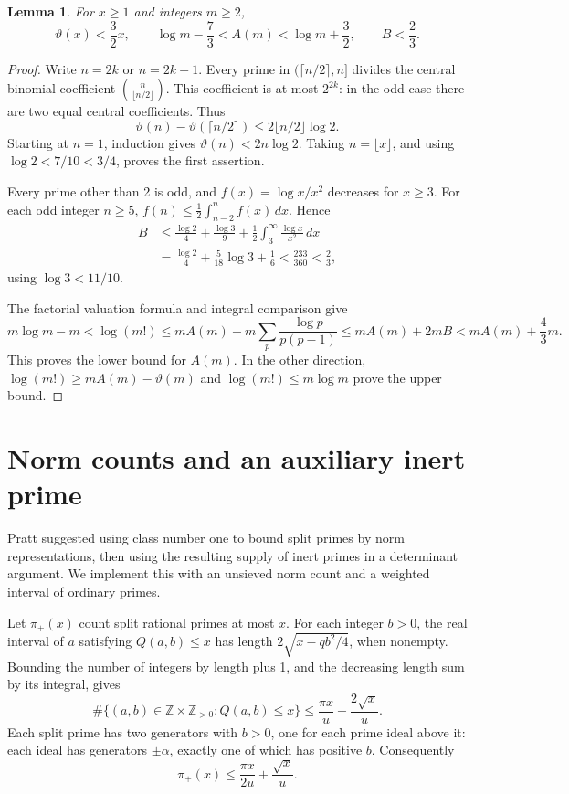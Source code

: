 \documentclass[11pt]{article}
\newtheorem{lemma}[theorem]{Lemma}
\newcommand{\Z}{\mathbb Z}
\begin{document}
\begin{lemma}\label{primelemma}
For \(x\ge1\) and integers \(m\ge2\),
\begin{equation}\label{prime-estimates}
 \vartheta(x)<\frac32x,\qquad
 \log m-\frac73<A(m)<\log m+\frac32,\qquad B<\frac23.
\end{equation}
\end{lemma}
\begin{proof}
Write \(n=2k\) or \(n=2k+1\). Every prime in
\((\lceil n/2\rceil,n]\) divides the central binomial coefficient
\(\binom n{\lfloor n/2\rfloor}\). This coefficient is at most
\(2^{2k}\): in the odd case there are two equal central coefficients.
Thus
\[
 \vartheta(n)-\vartheta(\lceil n/2\rceil)
 \le 2\lfloor n/2\rfloor\log2.
\]
Starting at \(n=1\), induction gives \(\vartheta(n)<2n\log2\).
Taking \(n=\lfloor x\rfloor\), and using \(\log2<7/10<3/4\),
proves the first assertion.

Every prime other than 2 is odd, and \(f(x)=\log x/x^2\) decreases
for \(x\ge3\). For each odd integer \(n\ge5\),
\(f(n)\le\tfrac12\int_{n-2}^n f(x)\,dx\). Hence
\begin{align*}
 B&\le\frac{\log2}{4}+\frac{\log3}{9}
                  +\frac12\int_3^\infty\frac{\log x}{x^2}\,dx\\
  &=\frac{\log2}{4}+\frac5{18}\log3+\frac16
    <\frac{233}{360}<\frac23,
\end{align*}
using \(\log3<11/10\).

The factorial valuation formula and integral comparison give
\[
 m\log m-m<\log(m!)
 \le mA(m)+m\sum_p\frac{\log p}{p(p-1)}
 \le mA(m)+2mB<mA(m)+\frac43m.
\]
This proves the lower bound for \(A(m)\). In the other direction,
\(\log(m!)\ge mA(m)-\vartheta(m)\) and
\(\log(m!)\le m\log m\) prove the upper bound.
\end{proof}

\section{Norm counts and an auxiliary inert prime}\label{norms}

Pratt \cite{pratt} suggested using class number one to bound split
primes by norm representations, then using the resulting supply of
inert primes in a determinant argument. We implement this with an
unsieved norm count and a weighted interval of ordinary primes.

Let \(\pi_+(x)\) count split rational primes at most \(x\). For each
integer \(b>0\), the real interval of \(a\) satisfying
\(Q(a,b)\le x\) has length \(2\sqrt{x-qb^2/4}\), when nonempty.
Bounding the number of integers by length plus 1, and the decreasing
length sum by its integral, gives
\[
 \#\{(a,b)\in\Z\times\Z_{>0}:Q(a,b)\le x\}
 \le\frac{\pi x}{u}+\frac{2\sqrt x}{u}.
\]
Each split prime has two generators with \(b>0\), one for each prime
ideal above it: each ideal has generators \(\pm\alpha\), exactly one
of which has positive \(b\). Consequently
\begin{equation}\label{split-count}
 \pi_+(x)\le\frac{\pi x}{2u}+\frac{\sqrt x}{u}.
\end{equation}
\end{document}
